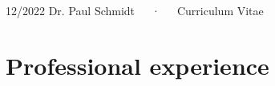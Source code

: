 \documentclass[11pt,a4paper,]{awesome-cv}
\begin{document}
\makecvheader

\makecvfooter
  {12/2022}
    {Dr. Paul Schmidt~~~·~~~Curriculum Vitae}
  {\thepage}






\hypertarget{professional-experience}{%
\section{Professional experience}\label{professional-experience}}
\end{document}
